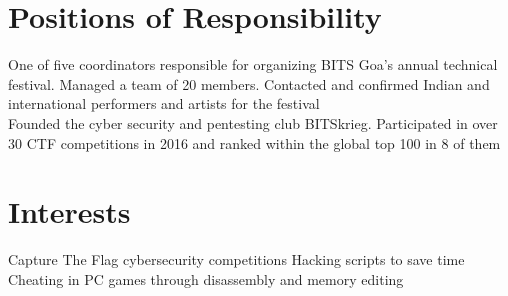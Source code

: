 \documentclass[]{illustris-resume-openfont}
\begin{document}
\begin{minipage}[t]{0.66\textwidth}
\section{Positions of Responsibility}
One of five coordinators responsible for organizing BITS Goa's annual technical festival. Managed a team of 20 members. Contacted and confirmed Indian and international performers and artists for the festival\\
\sectionsep
{}
Founded the cyber security and pentesting club BITSkrieg. Participated in over 30 CTF competitions in 2016 and ranked within the global top 100 in 8 of them

\section{Interests}
Capture The Flag cybersecurity competitions \textbullet{} Hacking scripts to save time \textbullet{} Cheating in PC games through disassembly and memory editing
\sectionsep

\end{minipage} 
\end{document}
